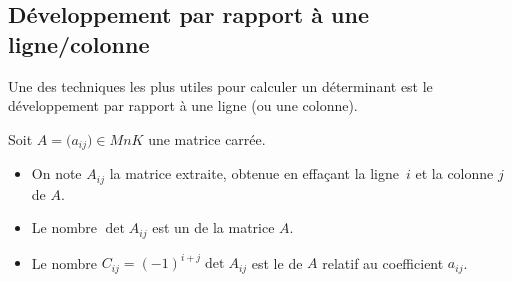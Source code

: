 \documentclass{book}
\begin{document}
\subsection{Développement par rapport à une ligne/colonne}

\begin{Texte}
Une des techniques les plus utiles pour calculer un déterminant est le développement par rapport à une ligne (ou une colonne).
\end{Texte}


\begin{Definition}
Soit $A = \big( a_{ij}\big) \in MnK$ une matrice carrée.
\begin{itemize}
  \item On note $A_{ij}$ la matrice extraite, obtenue en effaçant la ligne~$i$ et la colonne $j$ de $A$.
  \item Le nombre $\det A_{ij}$ est un  de la matrice $A$.
  \item Le nombre $C_{ij} = (-1)^{i+j}\det A_{ij}$ est le  de $A$
  relatif au coefficient $a_{ij}$.
\end{itemize}
\end{Definition}
\end{document}

